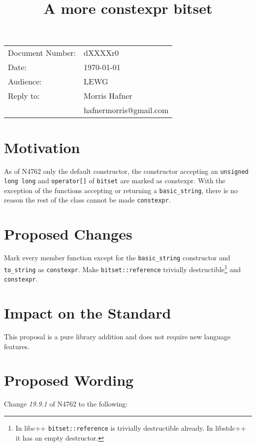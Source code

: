 \documentclass[ebook,11pt,article,a4paper]{memoir}
\title{A more constexpr bitset}
\date{}
\begin{document}
\maketitle
\hfill \begin{tabular}[t]{ll}
Document Number:& dXXXXr0  \\
Date:& \today  \\
Audience: & LEWG\\
Reply to: & Morris Hafner  \\
          & hafnermorris@gmail.com  \\
\end{tabular}

\chapter{Motivation}

As of N4762 only the default constructor, the constructor accepting an \texttt{unsigned long long} and \texttt{operator[]} of \texttt{bitset} are marked as constexpr. With the exception of the functions accepting or returning a \texttt{basic\_string}, there is no reason the rest of the class cannot be made \texttt{constexpr}.

\chapter{Proposed Changes}
Mark every member function except for the \texttt{basic\_string} constructor and \texttt{to\_string} as \texttt{constexpr}. Make \texttt{bitset::reference} trivially destructible\footnote{In libc++ \texttt{bitset::reference} is trivially destructible already. In libstdc++ it has an empty destructor.} and \texttt{constexpr}.

\chapter{Impact on the Standard}
This proposal is a pure library addition and does not require new language features.

\chapter{Proposed Wording}
Change \textit{19.9.1} of N4762 to the following:
\end{document}
